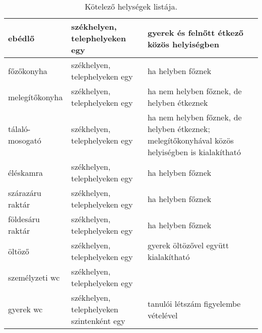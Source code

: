 \begin{table}[thb]
\begin{center}
\begin{tabular}{@{}p{4cm}|p{4cm}|p{6cm}@{}}
ebédlő                 & székhelyen, telephelyeken egy             & gyerek és felnőtt étkező közös helyiségben                                                      \\ \hline
főzőkonyha             & székhelyen, telephelyeken egy             & ha helyben főznek                                                                               \\ \hline
melegítőkonyha         & székhelyen, telephelyeken egy             & ha nem helyben főznek, de helyben étkeznek                                                      \\ \hline
tálaló-mosogató        & székhelyen, telephelyeken egy             & ha nem helyben főznek, de helyben étkeznek; melegítőkonyhával közös helyiségben is kialakítható \\ \hline
éléskamra              & székhelyen, telephelyeken egy             & ha helyben főznek                                                                               \\ \hline
szárazáru raktár       & székhelyen, telephelyeken egy             & ha helyben főznek                                                                               \\ \hline
földesáru raktár       & székhelyen, telephelyeken egy             & ha helyben főznek                                                                               \\ \hline
öltöző                 & székhelyen, telephelyeken egy             & gyerek öltözővel együtt kialakítható                                                            \\ \hline
személyzeti wc         & székhelyen, telephelyeken egy             &                                                                                                 \\ \hline
gyerek wc              & székhelyen, telephelyeken szintenként egy & tanulói létszám figyelembe vételével                                                            \\
\end{tabular}
\caption{Kötelező helységek listája.}
\label{tbl:helyisegek}
\end{center}
\end{table}
